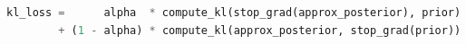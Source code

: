 \begin{algorithm}[b]
\fontsize{9.5}{12}\selectfont
\vspace*{-.8ex}
\begin{lstlisting}[language=Python]
kl_loss =      alpha  * compute_kl(stop_grad(approx_posterior), prior)
        + (1 - alpha) * compute_kl(approx_posterior, stop_grad(prior))
\end{lstlisting}
\vspace*{-.8ex}
\caption{KL Balancing with Automatic Differentiation}
\label{alg:klbalancing}
\end{algorithm}
